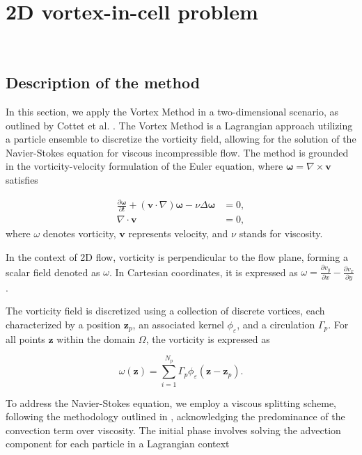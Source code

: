 
\section{2D vortex-in-cell problem}~\label{App_2D}
\subsection{Description of the method}


In this section, we apply the Vortex Method in a two-dimensional scenario, as outlined by Cottet et al. \cite{cottet_vortex_2000}. The Vortex Method is a Lagrangian approach utilizing a particle ensemble to discretize the vorticity field, allowing for the solution of the Navier-Stokes equation for viscous incompressible flow. The method is grounded in the vorticity-velocity formulation of the Euler equation, where $\bm \omega = \nabla \times \bm{v}$ satisfies

\[
	\begin{aligned}
		\frac{\partial \bm \omega}{\partial t} + (\bm{v} \cdot \nabla) \bm \omega - \nu \Delta \bm \omega & = 0, \\
		\nabla \cdot \bm v                                                                                & = 0,
	\end{aligned}
\]where $\omega$ denotes vorticity, $\bm{v}$ represents velocity, and $\nu$ stands for viscosity.

In the context of 2D flow, vorticity is perpendicular to the flow plane, forming a scalar field denoted as $\omega$. In Cartesian coordinates, it is expressed as $\omega = \frac{\partial v_y}{\partial x} - \frac{\partial v_x}{\partial y}$.

The vorticity field is discretized using a collection of discrete vortices, each characterized by a position $\bm z_p$, an associated kernel $\phi_\varepsilon$, and a circulation $\Gamma_p$. For all points $\bm z$ within the domain $\Omega$, the vorticity is expressed as

\begin{equation*}
	\omega(\bm z) = \sum_{i=1}^{N_p} \Gamma_p \phi_\varepsilon(\bm z - \bm z_p).
\end{equation*}

To address the Navier-Stokes equation, we employ a viscous splitting scheme, following the methodology outlined in \cite{cottet_1990}, acknowledging the predominance of the convection term over viscosity. The initial phase involves solving the advection component for each particle in a Lagrangian context

